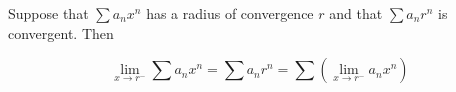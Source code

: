 \documentclass[12pt]{article}
\begin{document}
Suppose that $\sum a_{n} x^{n}$ has a radius of convergence $r$ and that $\sum a_{n} r^{n}$ is convergent.  Then

$$\lim_{x \to r^{-}} \sum a_{n} x^{n} = \sum a_{n} r^{n} = \sum (\lim_{x \to r^{-}} a_{n} x^{n})$$
\end{document}
